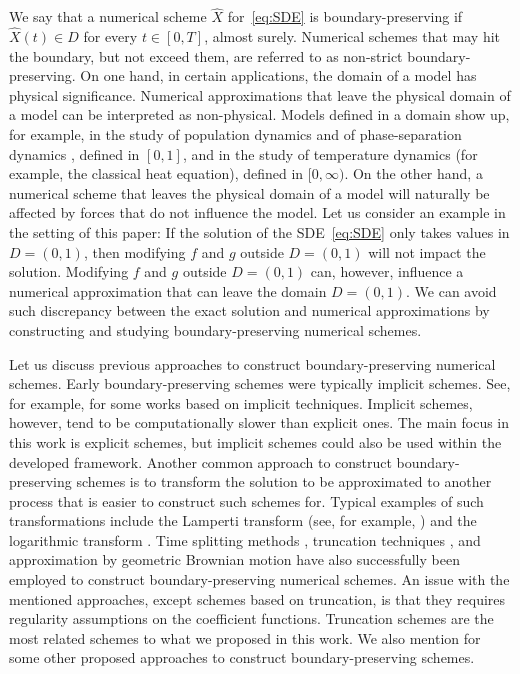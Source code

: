 \documentclass[11pt]{amsart}
\begin{document}
{We say that a numerical scheme $\hat{X}$ for~\eqref{eq:SDE} is boundary-preserving if $\hat{X}(t) \in D$ for every $t \in [0,T]$, almost surely. Numerical schemes that may hit the boundary, but not exceed them, are referred to as non-strict boundary-preserving. On one hand, in certain applications, the domain of a model has physical significance. Numerical approximations that leave the physical domain of a model can be interpreted as non-physical. Models defined in a domain show up, for example, in the study of population dynamics \cite{GraySIS,KERMACK199133} and of phase-separation dynamics \cite{ALLEN19791085}, defined in $[0,1]$, and in the study of temperature dynamics (for example, the classical heat equation), defined in $[0,\infty)$. On the other hand, a numerical scheme that leaves the physical domain of a model will naturally be affected by forces that do not influence the model. Let us consider an example in the setting of this paper: If the solution of the SDE~\eqref{eq:SDE} only takes values in $D = (0,1)$, then modifying $f$ and $g$ outside $D=(0,1)$ will not impact the solution. Modifying $f$ and $g$ outside $D = (0,1)$ can, however, influence a numerical approximation that can leave the domain $D = (0,1)$. We can avoid such discrepancy between the exact solution and numerical approximations by constructing and studying boundary-preserving numerical schemes.

Let us discuss previous approaches to construct boundary-preserving numerical schemes. Early boundary-preserving schemes were typically implicit schemes. See, for example, \cite{MR3006996,MR2931351,MR2898556,MR3248050,MR1410392} for some works based on implicit techniques. Implicit schemes, however, tend to be computationally slower than explicit ones. The main focus in this work is explicit schemes, but implicit schemes could also be used within the developed framework. Another common approach to construct boundary-preserving schemes is to transform the solution to be approximated to another process that is easier to construct such schemes for. Typical examples of such transformations include the Lamperti transform (see, for example, \cite{Mller2010FromSD}) and the logarithmic transform \cite{MR4274899}. Time splitting methods \cite{MR2341800}, truncation techniques \cite{MR4475995,MR4242953}, and approximation by geometric Brownian motion \cite{MR4177372,Bossy2024} have also successfully been employed to construct boundary-preserving numerical schemes. An issue with the mentioned approaches, except schemes based on truncation, is that they requires regularity assumptions on the coefficient functions. Truncation schemes are the most related schemes to what we proposed in this work. We also mention \cite{MR4780408,MR4729657,MR3433041,MR3331648,DomPres,UweakBP} for some other proposed approaches to construct boundary-preserving schemes.

}
\end{document}
